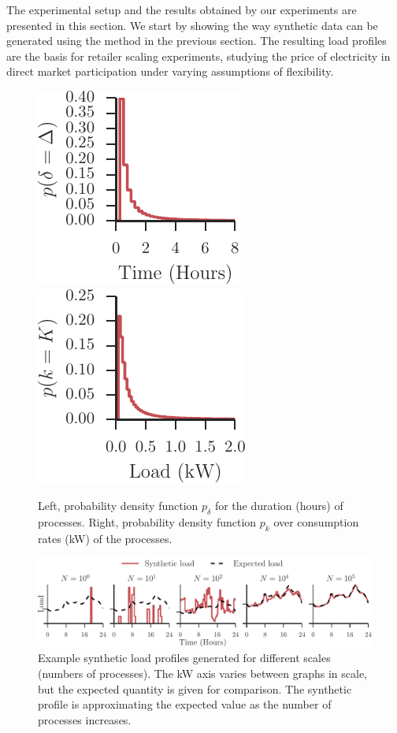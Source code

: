 \documentclass[conference]{IEEEtran}
\begin{document}
The experimental setup and the results obtained by our experiments are presented in this section. We start by showing the way synthetic data can be generated using the method in the previous section. The resulting load profiles are the basis for retailer scaling experiments, studying the price of electricity in direct market participation under varying assumptions of flexibility.

\begin{figure}[b]
\centering
\includegraphics{figures/delta.pdf}~\includegraphics{figures/kappa.pdf}
\caption{Left, probability density function $p_{\delta}$ for the duration (hours) of processes. Right, probability density function $p_k$ over consumption rates (kW) of the processes.}
\label{fig:devide-time-consumption}
\end{figure}

\begin{figure}[t]
\centering
\includegraphics{figures/slps.pdf}
\caption{Example synthetic load profiles generated for different scales (numbers of processes). The kW axis varies between graphs in scale, but the expected quantity is given for comparison. The synthetic profile is approximating the expected value as the number of processes increases.}
\label{fig:art_slps}
\vspace{-0.5cm}
\end{figure}
\end{document}
